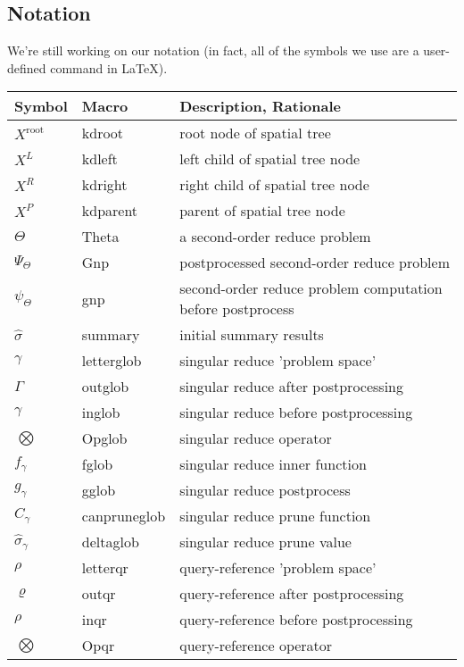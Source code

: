 \documentclass[times, leqno,twocolumn]{article}
\newcommand{\summary}{\hat{\sigma}}
\newcommand{\Gnp}{\Psi_{\Theta}}
\newcommand{\gnp}{\psi_{\Theta}}
\newcommand{\kdroot}[1]{#1^{\text{root}}}
\newcommand{\kdleft}[1]{#1^{\!L}}
\newcommand{\kdright}[1]{#1^{\!R}}
\newcommand{\kdparent}[1]{#1^{\!P}}
\newcommand{\nameOp}[2]{\mathop{#1\nolimits\!\!_{#2}}}
\newcommand{\myOp}[1]{\nameOp{\bigotimes}{#1}}
\newcommand{\letterglob}{\gamma}
\newcommand{\outglob}{\Gamma}
\newcommand{\inglob}{\gamma}
\newcommand{\Opglob}{\myOp{\letterglob}}
\newcommand{\fglob}{f_{\!\letterglob}}
\newcommand{\gglob}{g_{\!\letterglob}}
\newcommand{\canpruneglob}{C_{\!\letterglob}}
\newcommand{\deltaglob}{\summary_{\!\letterglob}}
\newcommand{\letterqr}{\rho}
\newcommand{\outqr}{\varrho}
\newcommand{\inqr}{\rho}
\newcommand{\Opqr}{\myOp{\letterqr}}
\begin{document}
\begin{appendix}

\section{Notation}

We're still working on our notation (in fact, all of the symbols we use are a user-defined command in LaTeX).

\begin{table*}
\begin{tabular}{|l|l|l|}
\hline
Symbol & Macro & Description, Rationale
\\ \hline $\kdroot{X}$ & kdroot & root node of spatial tree
\\ $\kdleft{X}$ & kdleft & left child of spatial tree node
\\ $\kdright{X}$ & kdright & right child of spatial tree node
\\ $\kdparent{X}$ & kdparent & parent of spatial tree node
\\ \hline $\Theta$ & Theta & a second-order reduce problem
\\ $\Gnp$ & Gnp & postprocessed second-order reduce problem
\\ $\gnp$ & gnp & second-order reduce problem computation before postprocess
\\ $\summary$ & summary & initial summary results
\\ \hline $\letterglob$ & letterglob & singular reduce 'problem space'
\\ $\outglob$ & outglob & singular reduce after postprocessing
\\ $\inglob$ & inglob & singular reduce before postprocessing
\\ $\Opglob$ & Opglob & singular reduce operator
\\ $\fglob$ & fglob & singular reduce inner function
\\ $\gglob$ & gglob & singular reduce postprocess
\\ $\canpruneglob$ & canpruneglob & singular reduce prune function
\\ $\deltaglob$ & deltaglob & singular reduce prune value
\\ \hline $\letterqr$ & letterqr & query-reference 'problem space'
\\ $\outqr$ & outqr & query-reference after postprocessing
\\ $\inqr$ & inqr & query-reference before postprocessing
\\ $\Opqr$ & Opqr & query-reference operator

\end{tabular}
\end{table*}
\end{appendix}
\end{document}
